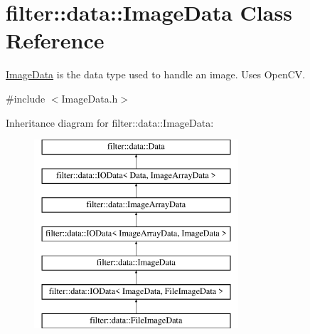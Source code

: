 \hypertarget{classfilter_1_1data_1_1_image_data}{}\section{filter\+:\+:data\+:\+:Image\+Data Class Reference}
\label{classfilter_1_1data_1_1_image_data}


\hyperlink{classfilter_1_1data_1_1_image_data}{Image\+Data} is the data type used to handle an image. Uses Open\+CV.  




{\ttfamily \#include $<$Image\+Data.\+h$>$}

Inheritance diagram for filter\+:\+:data\+:\+:Image\+Data\+:\begin{figure}[H]
\begin{center}
\leavevmode
\includegraphics[height=7.000000cm]{db/dbc/classfilter_1_1data_1_1_image_data}
\end{center}
\end{figure}
